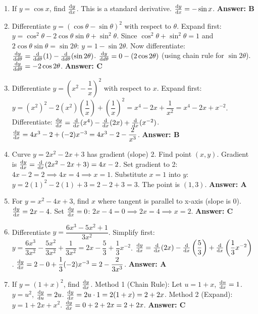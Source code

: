 \begin{enumerate}[label={\arabic*.}]
  \item If \(y = \cos x\), find \(\frac{\mathrm{d}y}{\mathrm{d}x}\). This is a standard derivative.
    \(\frac{\mathrm{d}y}{\mathrm{d}x} = -\sin x\).
    \textbf{Answer: B}

  \item Differentiate \(y = (\cos \theta - \sin \theta)^2\) with respect to \(\theta\).
    Expand first: \(y = \cos^2 \theta - 2\cos \theta \sin \theta + \sin^2 \theta\).
    Since \(\cos^2 \theta + \sin^2 \theta = 1\) and \(2\cos \theta \sin \theta = \sin 2\theta\):
    \(y = 1 - \sin 2\theta\).
    Now differentiate: \(\frac{\mathrm{d}y}{\mathrm{d}d\theta} = \frac{\mathrm{d}}{\mathrm{d}d\theta}(1) - \frac{\mathrm{d}}{\mathrm{d}d\theta}(\sin 2\theta)\).
    \(\frac{\mathrm{d}y}{\mathrm{d}d\theta} = 0 - (2\cos 2\theta)\) (using chain rule for \(\sin 2\theta\)).
    \(\frac{\mathrm{d}y}{\mathrm{d}d\theta} = -2\cos 2\theta\).
    \textbf{Answer: C}

  \item Differentiate \(y = \left(x^2 - \dfrac{1}{x}\right)^2\) with respect to \(x\).
    Expand first: \(y = (x^2)^2 - 2(x^2)\left(\dfrac{1}{x}\right) + \left(\dfrac{1}{x}\right)^2 = x^4 - 2x + \dfrac{1}{x^2} = x^4 - 2x + x^{-2}\).
    Differentiate: \(\frac{\mathrm{d}y}{\mathrm{d}x} = \frac{\mathrm{d}}{\mathrm{d}x}(x^4) - \frac{\mathrm{d}}{\mathrm{d}x}(2x) + \frac{\mathrm{d}}{\mathrm{d}x}(x^{-2})\).
    \(\frac{\mathrm{d}y}{\mathrm{d}x} = 4x^3 - 2 + (-2)x^{-3} = 4x^3 - 2 - \dfrac{2}{x^3}\).
    \textbf{Answer: B}

  \item Curve \(y = 2x^2 - 2x + 3\) has gradient (slope) \(2\). Find point \((x,y)\).
    Gradient is \(\frac{\mathrm{d}y}{\mathrm{d}x} = \frac{\mathrm{d}}{\mathrm{d}x}(2x^2 - 2x + 3) = 4x - 2\).
    Set gradient to 2: \(4x - 2 = 2 \implies 4x = 4 \implies x = 1\).
    Substitute \(x=1\) into \(y\): \(y = 2(1)^2 - 2(1) + 3 = 2 - 2 + 3 = 3\).
    The point is \((1,3)\).
    \textbf{Answer: A}

  \item For \(y = x^2 - 4x + 3\), find \(x\) where tangent is parallel to x-axis (slope is 0).
    \(\frac{\mathrm{d}y}{\mathrm{d}x} = 2x - 4\).
    Set \(\frac{\mathrm{d}y}{\mathrm{d}x} = 0\): \(2x - 4 = 0 \implies 2x = 4 \implies x = 2\).
    \textbf{Answer: C}

  \item Differentiate \(y = \dfrac{6x^3 - 5x^2 + 1}{3x^2}\).
    Simplify first: \(y = \dfrac{6x^3}{3x^2} - \dfrac{5x^2}{3x^2} + \dfrac{1}{3x^2} = 2x - \dfrac{5}{3} + \dfrac{1}{3}x^{-2}\).
    \(\frac{\mathrm{d}y}{\mathrm{d}x} = \frac{\mathrm{d}}{\mathrm{d}x}(2x) - \frac{\mathrm{d}}{\mathrm{d}x}\left(\dfrac{5}{3}\right) + \frac{\mathrm{d}}{\mathrm{d}x}\left(\dfrac{1}{3}x^{-2}\right)\).
    \(\frac{\mathrm{d}y}{\mathrm{d}x} = 2 - 0 + \dfrac{1}{3}(-2)x^{-3} = 2 - \dfrac{2}{3x^3}\).
    \textbf{Answer: A}

  \item If \(y = (1+x)^2\), find \(\frac{\mathrm{d}y}{\mathrm{d}x}\).
    Method 1 (Chain Rule): Let \(u = 1+x\), \(\frac{\mathrm{d}u}{\mathrm{d}x} = 1\). \(y=u^2\), \(\frac{\mathrm{d}y}{\mathrm{d}u}=2u\).
    \(\frac{\mathrm{d}y}{\mathrm{d}x} = 2u \cdot 1 = 2(1+x) = 2+2x\).
    Method 2 (Expand): \(y = 1 + 2x + x^2\).
    \(\frac{\mathrm{d}y}{\mathrm{d}x} = 0 + 2 + 2x = 2+2x\).
    \textbf{Answer: C}


\end{enumerate}
